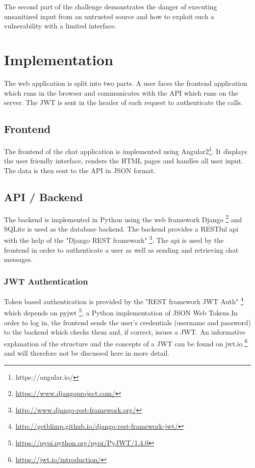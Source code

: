 \documentclass[12pt,a4paper]{article}
\begin{document}
The second part of the challenge demonstrates the danger of executing unsanitized input from an untrusted source and how to exploit such a vulnerability with a limited interface.


\section{Implementation}

The web application is split into two parts. A user faces the frontend application which runs in the browser and communicates with the API which runs on the server. The JWT is sent in the header of each request to authenticate the calls.

\subsection{Frontend}
The frontend of the chat application is implemented using Angular2\footnote{https://angular.io/}. It displays the user friendly interface, renders the HTML pages and handles all user input. The data is then sent to the API in JSON format. 
 
\subsection{API / Backend}
The backend is implemented in Python using the web framework Django \footnote{\url{https://www.djangoproject.com/}} and SQLite is used as the database backend. The backend provides a RESTful api with the help of the "Django REST framework" \footnote{\url{http://www.django-rest-framework.org/}}. The api is used by the frontend in order to authenticate a user as well as sending and retrieving chat messages. 

\subsubsection{JWT Authentication}
Token based authentication is provided by the "REST framework JWT Auth" \footnote{\url{http://getblimp.github.io/django-rest-framework-jwt/}} which depends on pyjwt \footnote{\url{https://pypi.python.org/pypi/PyJWT/1.4.0}}, a Python implementation of JSON Web Tokens.In order to log in, the frontend sends the user's credentials (username and password) to the backend which checks them and, if correct, issues a JWT. An informative explanation of the structure and the concepts of a JWT can be found on jwt.io \footnote{\url{https://jwt.io/introduction/}} and will therefore not be discussed here in more detail.
\end{document}
